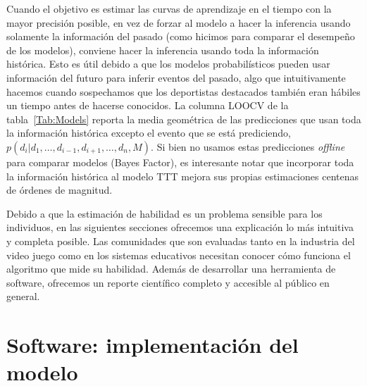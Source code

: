 \documentclass[a4paper,11pt]{book}
\theoremstyle{definition}
\begin{document}
Cuando el objetivo es estimar las curvas de aprendizaje en el tiempo con la mayor precisi\'on posible, en vez de forzar al modelo a hacer la inferencia usando solamente la informaci\'on del pasado (como hicimos para comparar el desempe\~no de los modelos), conviene hacer la inferencia usando toda la informaci\'on hist\'orica.
%
Esto es \'util debido a que los modelos probabil\'isticos pueden usar informaci\'on del futuro para inferir eventos del pasado, algo que intuitivamente hacemos cuando sospechamos que los deportistas destacados tambi\'en eran h\'abiles un tiempo antes de hacerse conocidos.
%
La columna LOOCV de la tabla~\ref{Tab:Models} reporta la media geom\'etrica de las predicciones que usan toda la informaci\'on hist\'orica excepto el evento que se est\'a prediciendo, $p(d_i| d_1, \dots, d_{i-1}, d_{i+1}, \dots, d_n , M)$.
%
Si bien no usamos estas predicciones \emph{offline} para comparar modelos (Bayes Factor), es interesante notar que incorporar toda la informaci\'on hist\'orica al modelo TTT mejora sus propias estimaciones centenas de \'ordenes de magnitud.

Debido a que la estimaci\'on de habilidad es un problema sensible para los individuos, en las siguientes secciones ofrecemos una explicaci\'on lo m\'as intuitiva y completa posible.
%
Las comunidades que son evaluadas tanto en la industria del video juego como en los sistemas educativos necesitan conocer c\'omo funciona el algoritmo que mide su habilidad.
%
Adem\'as de desarrollar una herramienta de software, ofrecemos un reporte cient\'ifico completo y accesible al p\'ublico en general.


\section{Software: implementaci\'on del modelo}
\end{document}
